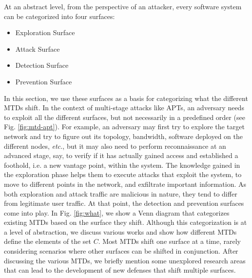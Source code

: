 At an abstract level, from the perspective of an attacker, every software system can be categorized into four surfaces:
\begin{itemize}
    \item Exploration Surface
    \item Attack Surface
    \item Detection Surface
    \item Prevention Surface
\end{itemize}
In this section, we use these surfaces as a basis for categorizing what the different MTDs shift.
In the context of multi-stage attacks like APTs, an adversary needs to exploit all the different surfaces, but not necessarily in a predefined order (see Fig. \ref{fig:mtd-apt}). For example, an adversary may first try to explore the target network and try to figure out its topology, bandwidth, software deployed on the different nodes, {\em etc.}, but it may also need to perform reconnaissance at an advanced stage, say, to verify if it has actually gained access and established a foothold, i.e. a new vantage point, within the system. The knowledge gained in the exploration phase helps them to execute attacks that exploit the system, to move to different points in the network, and exfiltrate important information.
As both exploration and attack traffic are malicious in nature, they tend to differ from legitimate user traffic. At that point, the detection and prevention surfaces come into play.
In Fig. \ref{fig:what}, we show a Venn diagram that categorizes existing MTDs based on the surface they shift. Although this categorization is at a level of abstraction, we discuss various works and show how different MTDs define the elements of the set $C$. Most MTDs shift one surface at a time, rarely considering scenarios where other surfaces can be shifted in conjunction. After discussing the various MTDs, we briefly mention some unexplored research areas that can lead to the development of new defenses that shift multiple surfaces.
